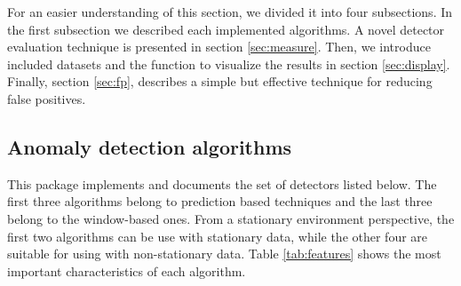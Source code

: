 \documentclass[a4paper]{article}\usepackage[]{graphicx}\usepackage[]{color}
\begin{document}
For an easier understanding of this section, we divided it into four subsections. In the first subsection we described each implemented algorithms. A novel detector evaluation technique is presented in section \ref{sec:measure}. Then, we introduce included datasets and the function to visualize the results in section \ref{sec:display}. Finally, section \ref{sec:fp},  describes a simple but effective technique for reducing false positives.

\subsection{Anomaly detection algorithms} \label{sec:detectors}

This package implements and documents the set of detectors listed below. The first three algorithms belong to prediction based techniques and the last three belong to the window-based ones. From a stationary environment perspective, the first two algorithms can be use with stationary data, while the other four are suitable for using with non-stationary data. Table \ref{tab:features} shows the most important characteristics of each algorithm.
\end{document}
